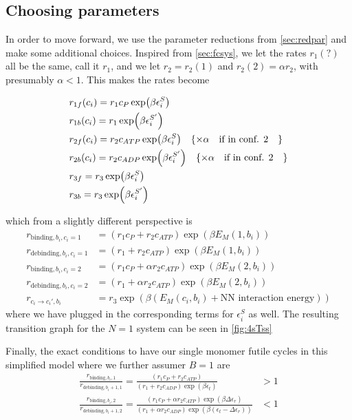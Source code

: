 \documentclass[11pt]{article}
\begin{document}
\subsection{Choosing parameters}\label{sec:simpar}
In order to move forward, we use the parameter reductions from \cref{sec:redpar} and make some additional choices.
Inspired from \cref{sec:fcsys}, we let the rates $r_1(?)$ all be the same, call it $r_1$, and we let $r_2=r_2(1)$ and $r_2(2)=\alpha r_2$, with presumably $\alpha < 1$.
This makes the rates become
\begin{tcolorbox}
    \begin{align}
        &r_{1f}(c_i) = r_1c_P\exp(\beta\epsilon_i^S) \label{eq:rate1f} \\
        &r_{1b}(c_i) = r_1\exp(\beta\epsilon_i^{S'}) \label{eq:rate1b} \\
        &r_{2f}(c_i) = r_2c_{ATP}\exp(\beta\epsilon_i^S) \quad \{\times \alpha \qq{if in conf. 2}\} \label{eq:rate2f} \\
        &r_{2b}(c_i) = r_2c_{ADP}\exp(\beta\epsilon_i^{S'}) \quad \{\times \alpha \qq{if in conf. 2}\} \label{eq:rate2b} \\
        &r_{3f} = r_3\exp(\beta\epsilon_i^S) \label{eq:rate3f} \\
        &r_{3b} = r_3\exp(\beta\epsilon_i^{S'}) \label{eq:rate3b}
    \end{align}
\end{tcolorbox}
which from a slightly different perspective is
\begin{align}
    r_{\text{binding},b_i,c_i=1} &= (r_1c_P+r_2c_{ATP})\exp(\beta E_M(1, b_i)) \\
    r_{\text{debinding},b_i,c_i=1} &= (r_1+r_2c_{ATP})\exp(\beta E_M(1, b_i)) \\
    r_{\text{binding},b_i,c_i=2} &= (r_1c_P+\alpha r_2c_{ATP})\exp(\beta E_M(2, b_i)) \\
    r_{\text{debinding},b_i,c_i=2} &= (r_1+\alpha r_2c_{ATP})\exp(\beta E_M(2, b_i)) \\
    r_{c_i \rightarrow c_i',b_i} &= r_3\exp(\beta (E_M(c_i, b_i) + \text{NN interaction energy}))
\end{align}
where we have plugged in the corresponding terms for $\epsilon_i^S$ as well.
The resulting transition graph for the $N=1$ system can be seen in \cref{fig:4sTss}

Finally, the exact conditions to have our single monomer futile cycles in this simplified model where we further assumer $B=1$ are
\begin{align}
    \frac{r_{\text{binding},b_i,1}}{r_{\text{debinding},b_i+1,1}} = \frac{(r_1c_P+r_2c_{ATP})}{(r_1+r_2c_{ADP})\exp(\beta \epsilon_t)} &> 1 \\
    \frac{r_{\text{binding},b_i,2}}{r_{\text{debinding},b_i+1,2}} = \frac{(r_1c_P+\alpha r_2c_{ATP})\exp(\beta \Delta\epsilon_r)}{(r_1+\alpha r_2c_{ADP})\exp(\beta (\epsilon_t-\Delta\epsilon_r))} &< 1 \\
\end{align}
\end{document}
